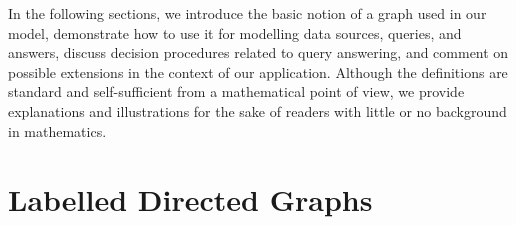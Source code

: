 
%

In the following sections, we introduce the basic notion of a graph used in our model,
demonstrate how to use it for modelling data sources, queries, and answers,
discuss decision procedures related to query answering,
and comment on possible extensions in the context of our application.
Although the definitions are standard and self-sufficient from a mathematical point of view,
we provide explanations and illustrations for the sake of readers with little or no background in
mathematics.

\section{Labelled Directed Graphs}
\label{sec:labelled_digraphs}

